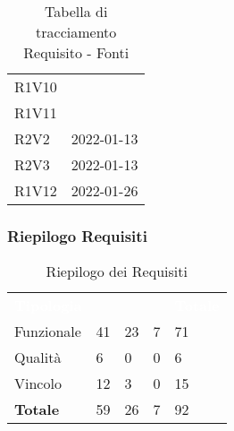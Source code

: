 \begin{table}[H]
\begin{tabular}[t]{ m{}<{\centering}  m{}<{\centering} }
	R1V10 & \Ca \\
	
	R1V11 & \Ca \\

	R2V2 & \Vi{} 2022-01-13 \\	
	 
	R2V3 & \Vi{} 2022-01-13 \\	
	 
	R1V12 & \Ve{} 2022-01-26 \\	

\end{tabular}
\caption{Tabella di tracciamento Requisito - Fonti}
\end{table}

\subsubsection{Riepilogo Requisiti}

\begin{table}[H]
\renewcommand{\arraystretch}{1.5}
\begin{tabular}{ m{}<{\centering}  m{}<{\centering}  m{}<{\centering}  m{}<{\centering}  m{}<{\centering} }
	\rowcolor{darkblue}
	\textcolor{white}{\textbf{Tipologia}} &\textcolor{white}{\textbf{\Ob}}& \textcolor{white}{\textbf{\De}} & \textcolor{white}{\textbf{\Fa}}&\textcolor{white}{\textbf{Totale}}\\ 
	Funzionale & 41 & 23 & 7 & 71\\	
	Qualità & 6 & 0 & 0 & 6 \\	
	Vincolo & 12 & 3 & 0 & 15 \\	
	\textbf{Totale} & 59 & 	26 & 7 & 92
\end{tabular}
\caption{Riepilogo dei Requisiti}
\end{table}